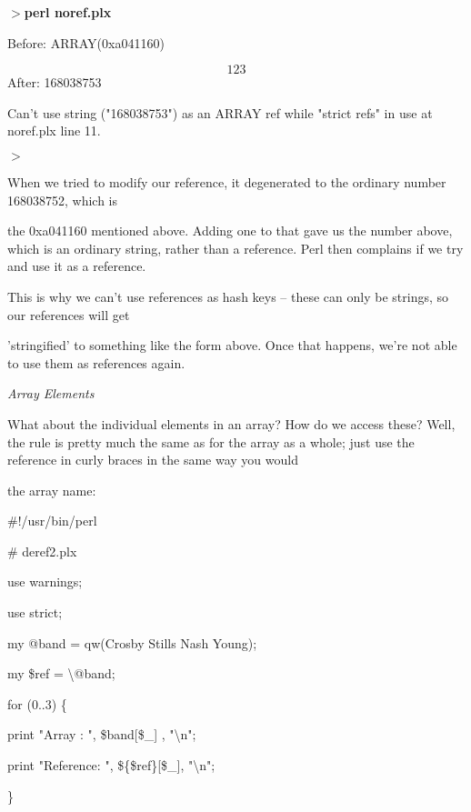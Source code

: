 \documentclass[a4paper,11pt]{book}
\begin{document}
\noindent $>$\textbf{perl noref.plx}

\noindent Before: ARRAY(0xa041160)

\[1 2 3 \] 
After: 168038753

\noindent Can't use string ("168038753") as an ARRAY ref while "strict refs" in use at noref.plx line 11.

\noindent $>$

\noindent 

\noindent When we tried to modify our reference, it degenerated to the ordinary number 168038752, which is

\noindent the 0xa041160 mentioned above. Adding one to that gave us the number above, which is an ordinary string, rather than a reference. Perl then complains if we try and use it as a reference.

\noindent 

\noindent This is why we can't use references as hash keys -- these can only be strings, so our references will get

\noindent 'stringified' to something like the form above. Once that happens, we're not able to use them as references again.

\noindent 

\noindent \textit{Array Elements}

\noindent What about the individual elements in an array? How do we access these? Well, the rule is pretty much the same as for the array as a whole; just use the reference in curly braces in the same way you would

\noindent the array name:

\noindent 

\noindent 

\noindent \#!/usr/bin/perl

\noindent \# deref2.plx

\noindent use warnings;

\noindent use strict;

\noindent 

\noindent my @band = qw(Crosby Stills Nash Young);

\noindent my \$ref  = \textbackslash @band;

\noindent for (0..3) \{

\noindent print "Array : ", \$band[\$\_]  , "\textbackslash n";

\noindent print "Reference: ", \$\{\$ref\}[\$\_], "\textbackslash n";

\noindent \}
\end{document}
